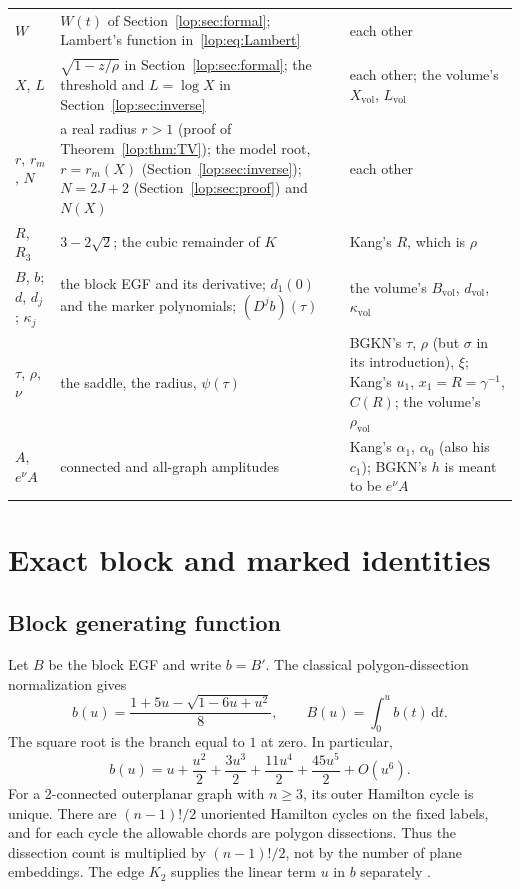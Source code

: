 \documentclass[11pt,letterpaper]{article}
\numberwithin{equation}{section}
\theoremstyle{remark}\newtheorem{remark}[theorem]{Remark}
\newcommand{\dd}{\,\mathrm d}
\begin{document}
\begin{longtable}{@{}>{\raggedright\arraybackslash}p{0.95in}>{\raggedright\arraybackslash}p{3.3in}>{\raggedright\arraybackslash}p{1.85in}@{}}
$W$ & $W(t)$ of Section~\ref{lop:sec:formal}; Lambert's function in~\eqref{lop:eq:Lambert} & each other\\
$X$, $L$ & $\sqrt{1-z/\rho}$ in Section~\ref{lop:sec:formal}; the threshold and $L=\log X$ in Section~\ref{lop:sec:inverse} & each other; the volume's $X_{\mathrm{vol}}$, $L_{\mathrm{vol}}$\\
$r$, $r_m$, $N$ & a real radius $r>1$ (proof of Theorem~\ref{lop:thm:TV}); the model root, $r=r_m(X)$ (Section~\ref{lop:sec:inverse}); $N=2J+2$ (Section~\ref{lop:sec:proof}) and $N(X)$ & each other\\
$R$, $R_3$ & $3-2\sqrt2$; the cubic remainder of $K$ & Kang's $R$, which is $\rho$\\
$B$, $b$; $d$, $d_j$; $\kappa_j$ & the block EGF and its derivative; $d_1(0)$ and the marker polynomials; $(D^jb)(\tau)$ & the volume's $B_{\mathrm{vol}}$, $d_{\mathrm{vol}}$, $\kappa_{\mathrm{vol}}$\\
$\tau$, $\rho$, $\nu$ & the saddle, the radius, $\psi(\tau)$ & BGKN's $\tau$, $\rho$ (but $\sigma$ in its introduction), $\xi$; Kang's $u_1$, $x_1=R=\gamma^{-1}$, $C(R)$; the volume's $\rho_{\mathrm{vol}}$\\
$A$, $e^\nu A$ & connected and all-graph amplitudes & Kang's $\alpha_1$, $\alpha_0$ (also his $c_1$); BGKN's $h$ is meant to be $e^\nu A$\\
\bottomrule
\end{longtable}
\endgroup

\section{Exact block and marked identities}\label{lop:sec:identities}

\subsection{Block generating function}
Let $B$ be the block EGF and write $b=B'$. The classical polygon-dissection
normalization gives
\begin{equation}\label{lop:eq:block}
 b(u)=\frac{1+5u-\sqrt{1-6u+u^2}}8,\qquad B(u)=\int_0^u b(t)\dd t.
\end{equation}
The square root is the branch equal to $1$ at zero. In particular,
\begin{equation}\label{lop:eq:blockseries}
 b(u)=u+\frac{u^2}{2}+\frac{3u^3}{2}
          +\frac{11u^4}{2}+\frac{45u^5}{2}+O(u^6).
\end{equation}
For a 2-connected outerplanar graph with $n\geq3$, its outer Hamilton
cycle is unique. There are $(n-1)!/2$ unoriented Hamilton cycles on the
fixed labels, and for each cycle the allowable chords are polygon
dissections. Thus the dissection count is multiplied by $(n-1)!/2$,
not by the number of plane embeddings. The edge $K_2$ supplies the
linear term $u$ in $b$ separately \cite{bk}.
\end{document}
